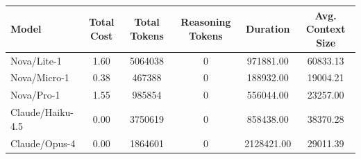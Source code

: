 \begin{longtable}{@{}l|c|c|c|c|c|@{}}
Model & Total Cost & Total Tokens & Reasoning Tokens & Duration & Avg. Context Size \\ \hline
Nova/Lite-1 & 1.60 & 5064038 & 0 & 971881.00 & 60833.13 \\ 
Nova/Micro-1 & 0.38 & 467388 & 0 & 188932.00 & 19004.21 \\ 
Nova/Pro-1 & 1.55 & 985854 & 0 & 556044.00 & 23257.00 \\ 
Claude/Haiku-4.5 & 0.00 & 3750619 & 0 & 858438.00 & 38370.28 \\ 
Claude/Opus-4 & 0.00 & 1864601 & 0 & 2128421.00 & 29011.39 \\ 
\end{longtable}
